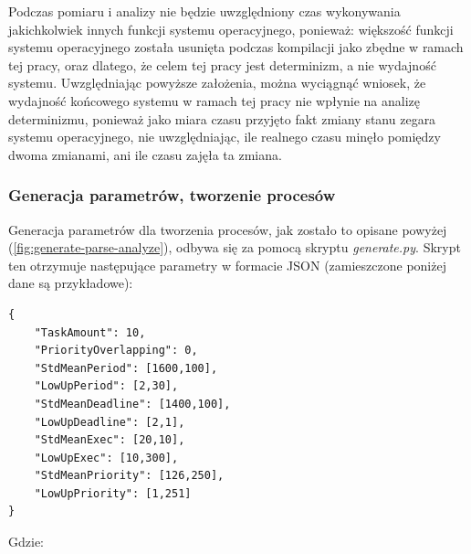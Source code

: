 \documentclass[../../main]{subfiles}
\begin{document}
Podczas pomiaru i analizy nie będzie uwzględniony czas wykonywania jakichkolwiek innych funkcji systemu operacyjnego, ponieważ: większość funkcji systemu operacyjnego została usunięta podczas kompilacji jako zbędne w ramach tej pracy, oraz dlatego, że celem tej pracy jest determinizm, a nie wydajność systemu. Uwzględniając powyższe założenia, można wyciągnąć wniosek, że wydajność końcowego systemu w ramach tej pracy nie wpłynie na analizę determinizmu, ponieważ jako miara czasu przyjęto fakt zmiany stanu zegara systemu operacyjnego, nie uwzględniając, ile realnego czasu minęło pomiędzy dwoma zmianami, ani ile czasu zajęła ta zmiana.

\subsubsection{Generacja parametrów, tworzenie procesów}

Generacja parametrów dla tworzenia procesów, jak zostało to opisane powyżej (\cref{fig:generate-parse-analyze}), odbywa się za pomocą skryptu \textit{generate.py}. Skrypt ten otrzymuje następujące parametry w formacie JSON (zamieszczone poniżej dane są przykładowe):

\begin{lstlisting}[caption={Parametry wejściowe do generacji}, label={lst:input-generation-parameters}]
{
    "TaskAmount": 10,
    "PriorityOverlapping": 0,
    "StdMeanPeriod": [1600,100],
    "LowUpPeriod": [2,30],
    "StdMeanDeadline": [1400,100],
    "LowUpDeadline": [2,1],
    "StdMeanExec": [20,10],
    "LowUpExec": [10,300],
    "StdMeanPriority": [126,250],
    "LowUpPriority": [1,251]
}
\end{lstlisting}

Gdzie:
\end{document}
